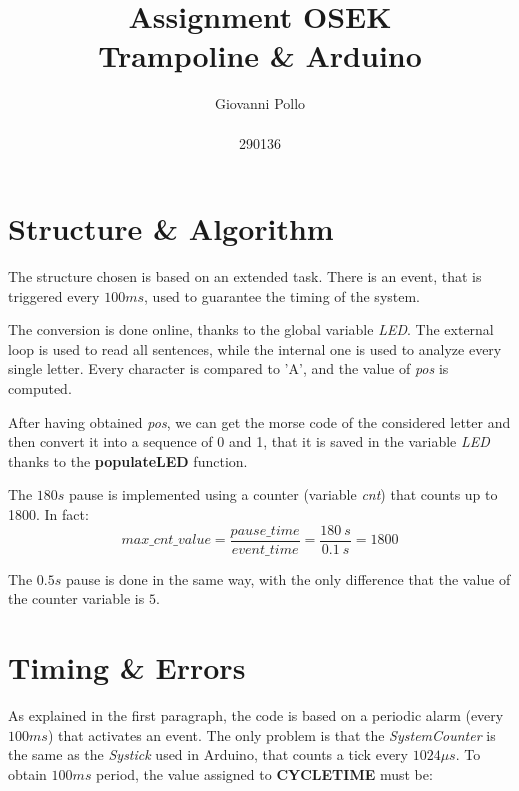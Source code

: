 \documentclass[a4paper]{article}
\title{\Huge Assignment OSEK \\ \LARGE Trampoline \& Arduino}
\author{\huge Giovanni Pollo \\ \\ \huge 290136}
\date{}
\begin{document}
\begin{titlepage}
  \centering
  \vspace{2px}
\end{titlepage}
\maketitle




\newpage


\section{Structure \& Algorithm}
The structure chosen is based on an extended task. There is an event, that is triggered every \(100ms\), used to guarantee the timing of the system.

The conversion is done online, thanks to the global variable \emph{LED}. The external loop is used to read all sentences, while the internal one is used to analyze every single letter. Every character is compared to 'A', and the value of \emph{pos} is computed.

After having obtained \emph{pos}, we can get the morse code of the considered letter and then convert it into a sequence of 0 and 1, that it is saved in the variable \emph{LED} thanks to the \textbf{populateLED} function.

The \(180s\) pause is implemented using a counter (variable \emph{cnt}) that counts up to 1800. In fact:
\begin{equation}
  max\_cnt\_value = \frac{pause\_time}{event\_time} = \frac{180\ s}{0.1\ s} = 1800
\end{equation}

The \(0.5s\) pause is done in the same way, with the only difference that the value of the counter variable is \(5\).


\section{Timing \& Errors}

As explained in the first paragraph, the code is based on a periodic alarm (every \(100ms\)) that activates an event. The only problem is that the \emph{SystemCounter} is the same as the \emph{Systick} used in Arduino, that counts a tick every \(1024 \mu s\). To obtain \(100ms\) period, the value assigned to  \textbf{CYCLETIME} must be:
\end{document}
